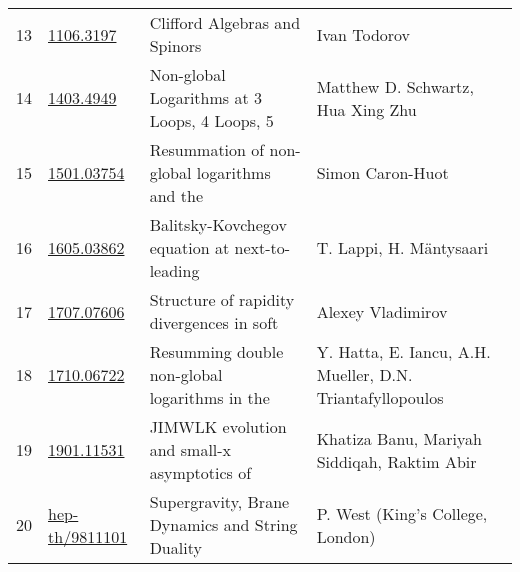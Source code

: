 \begin{tabular}{llll}
13 &  \href{https://arxiv.org/abs/1106.3197v2}{1106.3197} &  Clifford Algebras and Spinors &  Ivan Todorov \\
14 &  \href{https://arxiv.org/abs/1403.4949v2}{1403.4949} &  Non-global Logarithms at 3 Loops, 4 Loops, 5 &  Matthew D. Schwartz, Hua Xing Zhu \\
15 &  \href{https://arxiv.org/abs/1501.03754v2}{1501.03754} &  Resummation of non-global logarithms and the &  Simon Caron-Huot \\
16 &  \href{https://arxiv.org/abs/1605.03862v1}{1605.03862} &  Balitsky-Kovchegov equation at next-to-leading &  T. Lappi, H. Mäntysaari \\
17 &  \href{https://arxiv.org/abs/1707.07606v2}{1707.07606} &  Structure of rapidity divergences in soft &  Alexey Vladimirov \\
18 &  \href{https://arxiv.org/abs/1710.06722v1}{1710.06722} &  Resumming double non-global logarithms in the &  Y. Hatta, E. Iancu, A.H. Mueller, D.N. Triantafyllopoulos \\
19 &  \href{https://arxiv.org/abs/1901.11531v2}{1901.11531} &  JIMWLK evolution and small-x asymptotics of &  Khatiza Banu, Mariyah Siddiqah, Raktim Abir \\
20 &  \href{https://arxiv.org/abs/hep-th/9811101v1}{hep-th/9811101} &  Supergravity, Brane Dynamics and String Duality &  P. West (King's College, London) \\
\bottomrule
\end{tabular}
